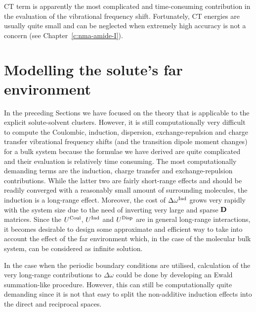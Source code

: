 \documentclass[a4paper,titlepage,twoside,fleqn,12pt]{book}
\begin{document}
\begin{refsection}
CT term is apparently the most complicated and time\hyp{}consuming contribution
in the evaluation of the vibrational frequency shift.
Fortunately, CT energies are usually quite small
and can be neglected when extremely high accuracy is not
a concern (see Chapter~\ref{c:nma-amide-I}).

\section{Modelling the solute's far environment\label{s:far-environ}}

In the preceding Sections we have focused on the
theory that is applicable to the explicit solute\hyp{}solvent
clusters. However, it is still computationally very difficult 
to compute the Coulombic, induction, dispersion, exchange\hyp{}repulsion
and charge transfer vibrational frequency shifts (and the transition dipole moment changes)
for a bulk system because the formulae we have derived are quite
complicated and their evaluation is relatively time consuming. The most computationally
demanding terms are the induction, charge transfer and exchange\hyp{}repulsion contributions.
While the latter two are fairly short\hyp{}range effects
and should be readily converged with a reasonably small amount of
surrounding molecules, the induction is a long\hyp{}range effect. Moreover,
the cost of $\Delta\omega^{\rm Ind}$ grows very rapidly with the system size
due to the need of inverting very large and sparse $\bf D$ matrices.
Since the $U^{\rm Coul}$, $U^{\rm Ind}$ and $U^{\rm Disp}$
are in general long\hyp{}range interactions, it becomes desirable
to design some approximate and efficient way to take into account the
effect of the far environment which, in the case of the molecular bulk 
system, can be considered as infinite solution.

In the case when the periodic boundary conditions are utilised, 
calculation of the very long\hyp{}range contributions to $\Delta\omega$ 
could be done by developing an Ewald summation\hyp{}like procedure.
However, this can still be computationally quite demanding since it is
not that easy to split the non\hyp{}additive induction effects
into the direct and reciprocal spaces.


\end{refsection}
\end{document}
